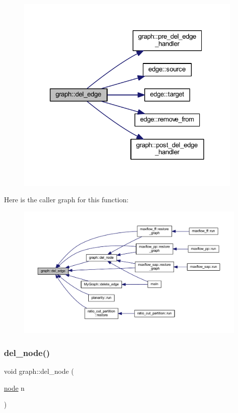 \begin{figure}[H]
\begin{center}
\leavevmode
\includegraphics[width=312pt]{classgraph_ad9356508c49c542dfd4b7169297387c6_cgraph}
\end{center}
\end{figure}
Here is the caller graph for this function\+:
\nopagebreak
\begin{figure}[H]
\begin{center}
\leavevmode
\includegraphics[width=350pt]{classgraph_ad9356508c49c542dfd4b7169297387c6_icgraph}
\end{center}
\end{figure}
\mbox{\label{classgraph_a8bdc09d5b9ac4bd26586b054d8fcbe91}} 
\subsubsection{\texorpdfstring{del\+\_\+node()}{del\_node()}}
{\footnotesize\ttfamily void graph\+::del\+\_\+node (\begin{DoxyParamCaption}\item[{\mbox{\hyperlink{classnode}{node}}}]{n }\end{DoxyParamCaption})\hspace{0.3cm}{\ttfamily [inherited]}}

